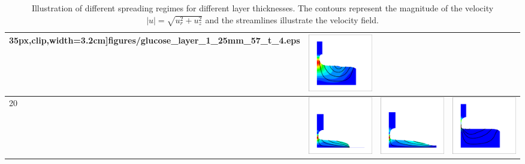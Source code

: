 \documentclass[aip,graphicx]{revtex4-1}
\begin{document}
\begin{table}[!ht]
\begin{tabular}{l | >{\centering\arraybackslash}m{3.5cm} | >{\centering\arraybackslash}m{3.5cm} | >{\centering\arraybackslash}m{3.5cm}}
{      35px},clip,width=3.2cm]{figures/glucose_layer_1_25mm_57_t_4.eps}
  & \includegraphics[trim={45px 35px 35px
      35px},clip,width=3.2cm]{figures/glucose_layer_12_5mm_60_t_4.eps}
  \\ \hline 20 & \includegraphics[trim={45px 35px 35px
      35px},clip,width=3.2cm]{figures/glucose_layer_0_0125mm_893_t_20.eps}
  & \includegraphics[trim={45px 35px 35px
      35px},clip,width=3.2cm]{figures/glucose_layer_1_25mm_281_t_20.eps}
  & \includegraphics[trim={45px 35px 35px
      35px},clip,width=3.2cm]{figures/glucose_layer_12_5mm_285_t_20.eps}
  \\
 \end{tabular}
 \caption{Illustration of different spreading regimes for different
   layer thicknesses. The contours represent the magnitude of the
   velocity $|u|=\sqrt{u_r^2+u_z^2}$ and the streamlines illustrate
   the velocity field.}
 \label{tab:spreading_regimes}
\end{table}
\end{document}
